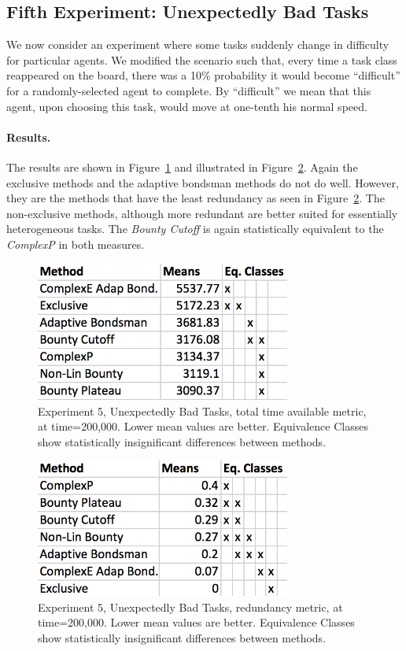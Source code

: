 \documentclass[letterpaper]{aamas2015}
\newcommand\paragrapha[1]{\paragraph*{{#1}.}}
\begin{document}
\subsection{Fifth Experiment: Unexpectedly Bad Tasks}
We now consider an experiment where some tasks suddenly change in difficulty for particular agents. We modified the scenario such that, every time a task class reappeared on the board, there was a 10\% probability it would become ``difficult'' for a randomly-selected agent to complete.  By ``difficult'' we mean that this agent, upon choosing this task, would move at 
one-tenth his normal speed.

\paragrapha{Results} 

The results are shown in Figure~\ref{trapsT} and illustrated in Figure~\ref{trapsR}.  Again the exclusive methods and the adaptive bondsman methods do not do well.  However, they are the methods that have the least redundancy as seen in Figure~\ref{trapsR}.  The non-exclusive methods, although more redundant are better suited for essentially heterogeneous tasks.  The \textit{Bounty Cutoff} is again statistically equivalent to the \textit{ComplexP} in both measures.


\begin{figure}[t]
\begin{center}\includegraphics[width=3.3in]{trapsT.png}\end{center}
\vspace{-0.5em}\caption{Experiment 5, Unexpectedly Bad Tasks, total time available metric, at time=200,000.  Lower mean values are better.  Equivalence Classes show statistically insignificant differences between methods.}
\label{trapsT}
\end{figure}

\begin{figure}[t]
\begin{center}\includegraphics[width=3.3in]{trapsR.png}\end{center}
\vspace{-0.5em}\caption{Experiment 5, Unexpectedly Bad Tasks, redundancy metric, at time=200,000.  Lower mean values are better.  Equivalence Classes show statistically insignificant differences between methods.}
\label{trapsR}
\end{figure}
\end{document}
